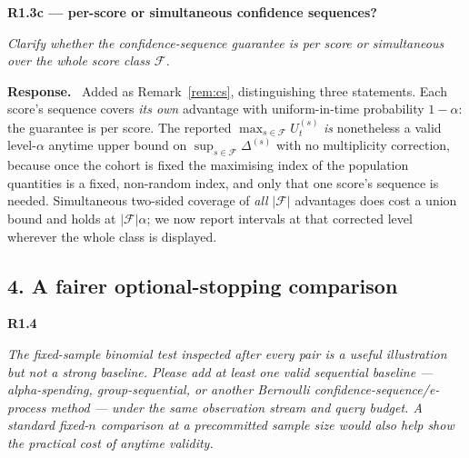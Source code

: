 \documentclass[11pt,a4paper]{article}
\newcommand{\F}{\mathcal{F}}
\newenvironment{point}[1]{%
  \par\medskip\noindent\textbf{\color{rcol}#1}\par\nopagebreak\smallskip\begingroup
  \color{rcol}\itshape}{\endgroup\par}
\newenvironment{reply}{%
  \par\smallskip\noindent\textbf{\color{acol}Response.}\ \begingroup}{\endgroup\par}
\begin{document}
\begin{point}{R1.3c --- per-score or simultaneous confidence sequences?}
Clarify whether the confidence-sequence guarantee is per score or simultaneous over the
whole score class $\F$.
\end{point}

\begin{reply}
Added as Remark~\ref{rem:cs}, distinguishing three statements. Each score's sequence covers
\emph{its own} advantage with uniform-in-time probability $1-\alpha$: the guarantee is
per score. The reported $\max_{s\in\F} U_t^{(s)}$ \emph{is} nonetheless a valid
level-$\alpha$ anytime upper bound on $\sup_{s\in\F}\Delta^{(s)}$ with no multiplicity
correction, because once the cohort is fixed the maximising index of the population
quantities is a fixed, non-random index, and only that one score's sequence is needed.
Simultaneous two-sided coverage of \emph{all} $|\F|$ advantages does cost a union bound
and holds at $|\F|\alpha$; we now report intervals at that corrected level wherever the
whole class is displayed.
\end{reply}

\subsection*{4. A fairer optional-stopping comparison}

\begin{point}{R1.4}
The fixed-sample binomial test inspected after every pair is a useful illustration but
not a strong baseline. Please add at least one valid sequential baseline --- alpha-spending,
group-sequential, or another Bernoulli confidence-sequence/e-process method --- under the
same observation stream and query budget. A standard fixed-$n$ comparison at a
precommitted sample size would also help show the practical cost of anytime validity.
\end{point}
\end{document}
